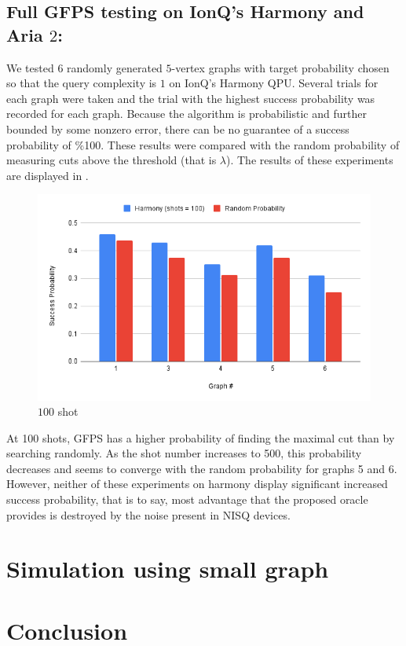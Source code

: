\documentclass[reqno,10pt]{amsart}
\numberwithin{equation}{section}                %
\begin{document}
\medskip

\subsection{Full GFPS testing on IonQ's Harmony and Aria $2$:}

We tested $6$ randomly generated $5$-vertex graphs with target probability chosen so that the query complexity is $1$ on IonQ's Harmony QPU. Several trials for each graph were taken and the trial with the highest success probability was recorded for each graph. Because the algorithm is probabilistic and further bounded by some nonzero error, there can be no guarantee of a success probability of \%100. These results were compared with the random probability of measuring cuts above the threshold (that is $\lambda$). The results of these experiments are displayed in .

\begin{figure}[!h]
   \centering
   \includegraphics[width=.5\linewidth]{100shotGraph.png}
   \caption{$100$ shot}
   \label{fig:Harmony}
\end{figure} 

At 100 shots, GFPS has a higher probability of finding the maximal cut than by searching randomly. As the shot number increases to 500, this probability decreases and seems to converge with the random probability for graphs 5 and 6. However, neither of these experiments on harmony display significant increased success probability, that is to say, most advantage that the proposed oracle provides is destroyed by the noise present in NISQ devices.

\bigskip

\section{Simulation using small graph}
\label{sec:smallgraphs}



\bigskip

\section{Conclusion}
\label{sec:conclusion}



   
\end{document}
